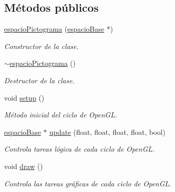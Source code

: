 \subsection*{Métodos públicos}
\begin{DoxyCompactItemize}
\item 
\hyperlink{classespacio_pictograma_a0f02bce6037dbf68a0fa644fd371d70c}{espacio\+Pictograma} (\hyperlink{classespacio_base}{espacio\+Base} $\ast$)
\begin{DoxyCompactList}\small\item\em Constructor de la clase. \end{DoxyCompactList}\item 
\hyperlink{classespacio_pictograma_a2dc94d6bc4ea2dec4d631d8bb8d8eb58}{$\sim$espacio\+Pictograma} ()
\begin{DoxyCompactList}\small\item\em Destructor de la clase. \end{DoxyCompactList}\item 
void \hyperlink{classespacio_pictograma_a88576adb5f56ddc7d2c735f349a4864d}{setup} ()
\begin{DoxyCompactList}\small\item\em Método inicial del ciclo de Open\+G\+L. \end{DoxyCompactList}\item 
\hyperlink{classespacio_base}{espacio\+Base} $\ast$ \hyperlink{classespacio_pictograma_a2ebefcf2c0838ef08d067a39c307ed6d}{update} (float, float, float, float, bool)
\begin{DoxyCompactList}\small\item\em Controla tareas lógica de cada ciclo de Open\+G\+L. \end{DoxyCompactList}\item 
void \hyperlink{classespacio_pictograma_a0f869dd16b4431009825ef13527e40db}{draw} ()
\begin{DoxyCompactList}\small\item\em Controla las tareas gráficas de cada ciclo de Open\+G\+L. \end{DoxyCompactList}\end{DoxyCompactItemize}
